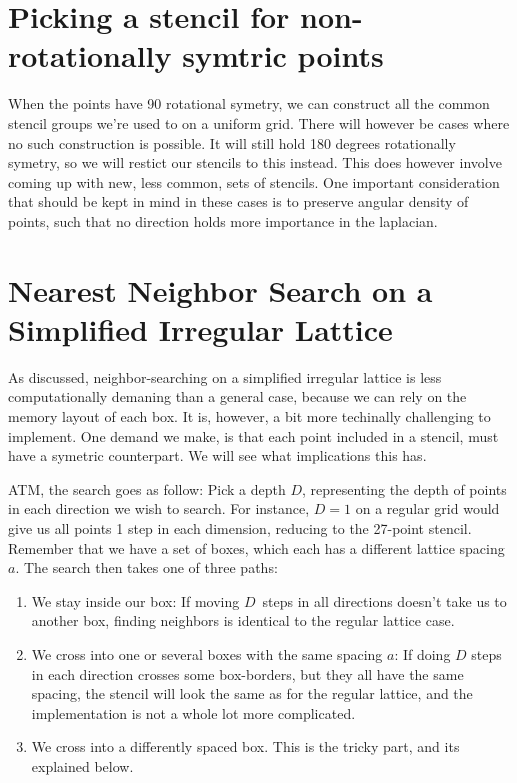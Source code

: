 \documentclass[12p,a4paper]{article}
\begin{document}
\section{Picking a stencil for non-rotationally symtric points}
When the points have 90 rotational symetry, we can construct all the common stencil groups we're used to on a uniform grid. There will however be cases where no such construction is possible. It will still hold 180 degrees rotationally symetry, so we will restict our stencils to this instead. This does however involve coming up with new, less common, sets of stencils. One important consideration that should be kept in mind in these cases is to preserve angular density of points, such that no direction holds more importance in the laplacian.




\section{Nearest Neighbor Search on a Simplified Irregular Lattice}
As discussed, neighbor-searching on a simplified irregular lattice is less computationally demaning than a general case, because we can rely on the memory layout of each box. It is, however, a bit more techinally challenging to implement. One demand we make, is that each point included in a stencil, must have a symetric counterpart. We will see what implications this has.

ATM, the search goes as follow: Pick a depth $D$, representing the depth of points in each direction we wish to search. For instance, $D=1$ on a regular grid would give us all points 1 step in each dimension, reducing to the 27-point stencil. Remember that we have a set of boxes, which each has a different lattice spacing $a$. The search then takes one of three paths:
\begin{enumerate}
    \item We stay inside our box: If moving $D$ steps in all directions doesn't take us to another box, finding neighbors is identical to the regular lattice case.
    \item We cross into one or several boxes with the same spacing $a$: If doing $D$ steps in each direction crosses some box-borders, but they all have the same spacing, the stencil will look the same as for the regular lattice, and the implementation is not a whole lot more complicated.
    \item We cross into a differently spaced box. This is the tricky part, and its explained below.
\end{enumerate}
\end{document}
